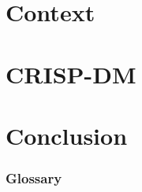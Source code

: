 \documentclass[11pt, a4paper]{article}
\begin{document}
\begin{sloppypar}
%

\part{Context}



\part{CRISP-DM}








\part{Conclusion}


\newpage
\printbibliography[heading=bibintoc, title={Bibliography}]

\newpage
\section*{Glossary}
\printtermlist

\newpage


\end{sloppypar}
\end{document}
